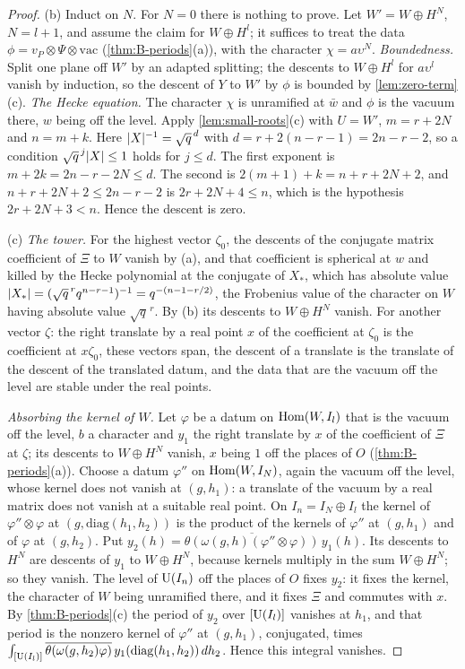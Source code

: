 \begin{proof}
(b) Induct on $N$. For $N=0$ there is nothing to prove. Let $W'=W\oplus H^{N}$, $N=l+1$, and assume the claim for $W\oplus H^l$; it suffices to treat the data $\phi=v_P\otimes\Psi\otimes\mathrm{vac}$ (\cref{thm:B-periods}(a)), with
the character $\chi=a\upsilon^N$. \emph{Boundedness.} Split one plane off $W'$ by an adapted splitting; the descents to $W\oplus H^l$ for $a\upsilon^l$ vanish by induction, so the descent of $Y$ to $W'$ by $\phi$ is bounded by
\cref{lem:zero-term}(c). \emph{The Hecke equation.} The character $\chi$ is unramified at $\bar w$ and $\phi$ is the vacuum there, $w$ being off the level. Apply \cref{lem:small-roots}(c) with $U=W'$, $m=r+2N$ and $n=m+k$. Here
$\lvert X\rvert^{-1}=\sqrt q^{\,d}$ with $d=r+2(n-r-1)=2n-r-2$, so a condition $\sqrt q^{\,j}\lvert X\rvert\le1$ holds for $j\le d$. The first exponent is $m+2k=2n-r-2N\le d$. The second is $2(m+1)+k=n+r+2N+2$, and $n+r+2N+2\le2n-r-2$ is
$2r+2N+4\le n$, which is the hypothesis $2r+2N+3<n$. Hence the descent is zero.

(c) \emph{The tower.} For the highest vector $\zeta_0$, the descents of the conjugate matrix coefficient of $\Xi$ to $W$ vanish by (a), and that coefficient is spherical at $w$ and killed by the Hecke polynomial at the
conjugate of $X_*$, which has absolute value $\lvert X_*\rvert=(\sqrt q^{\,r}q^{n-r-1})^{-1}=q^{-(n-1-r/2)}$, the Frobenius value of the character on $W$ having absolute value $\sqrt q^{\,r}$. By (b) its descents to $W\oplus H^N$ vanish. For
another vector $\zeta$: the right translate by a real point $x$ of the coefficient at $\zeta_0$ is the coefficient at $x\zeta_0$, these vectors span, the descent of a translate is the translate of the descent of the translated
datum, and the data that are the vacuum off the level are stable under the real points.

\emph{Absorbing the kernel of $W$.} Let $\varphi$ be a datum on $\operatorname{Hom}(W,I_l)$ that is the vacuum off the level, $b$ a character and $y_1$ the right translate by $x$ of the coefficient of $\Xi$ at $\zeta$; its descents to $W\oplus H^N$
vanish, $x$ being $1$ off the places of $O$ (\cref{thm:B-periods}(a)). Choose a datum $\varphi''$ on $\operatorname{Hom}(W,I_N)$, again the vacuum off the level, whose kernel does not vanish at $(g,h_1)$: a translate of the vacuum by
a real matrix does not vanish at a suitable real point. On $I_n=I_N\oplus I_l$ the kernel of $\varphi''\otimes\varphi$ at $(g,\mathrm{diag}(h_1,h_2))$ is the product of the kernels of $\varphi''$ at $(g,h_1)$ and of $\varphi$ at $(g,h_2)$. Put
$y_2(h)=\overline{\theta(\omega(g,h)(\varphi''\otimes\varphi))}\,y_1(h)$. Its descents to $H^N$ are descents of $y_1$ to $W\oplus H^N$, because kernels multiply in the sum $W\oplus H^N$; so they vanish. The level of $\operatorname{U}(I_n)$ off the
places of $O$ fixes $y_2$: it fixes the kernel, the character of $W$ being unramified there, and it fixes $\Xi$ and commutes with $x$. By \cref{thm:B-periods}(c) the period of $y_2$ over $[\operatorname{U}(I_l)]$ vanishes at $h_1$, and that
period is the nonzero kernel of $\varphi''$ at $(g,h_1)$, conjugated, times $\int_{[\operatorname{U}(I_l)]}\overline{\theta(\omega(g,h_2)\varphi)}\,y_1(\mathrm{diag}(h_1,h_2))\,dh_2$. Hence this integral vanishes.


\end{proof}
